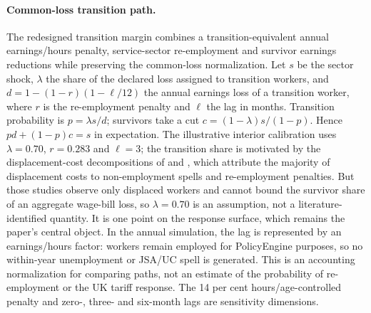 \paragraph{Common-loss transition path.} The redesigned transition margin
combines a transition-equivalent annual earnings/hours penalty, service-sector
re-employment and survivor earnings reductions while preserving the common-loss
normalization. Let $s$ be
the sector shock, $\lambda$ the share of the declared loss assigned to
transition workers, and $d=1-(1-r)(1-\ell/12)$ the annual earnings loss of a
transition worker, where $r$ is the re-employment penalty and $\ell$ the lag in
months. Transition probability is $p=\lambda s/d$; survivors take a cut
$c=(1-\lambda)s/(1-p)$. Hence $pd+(1-p)c=s$ in expectation. The illustrative
interior calibration uses $\lambda=0.70$, $r=0.283$ and $\ell=3$; the
transition share is motivated by the displacement-cost decompositions of
\citet{rud2022} and \citet{dixcarneiro2014}, which attribute the majority of
displacement costs to non-employment spells and re-employment penalties.
But those studies observe only displaced workers and cannot bound the
survivor share of an aggregate wage-bill loss, so $\lambda=0.70$ is an
assumption, not a literature-identified quantity. It is
one point on the response surface, which remains the paper's central
object. In the annual
simulation, the lag is represented by an earnings/hours factor: workers remain
employed for PolicyEngine purposes, so no within-year unemployment or JSA/UC
spell is generated. This is an accounting normalization for comparing paths,
not an estimate of the probability of re-employment or the UK tariff response.
The 14 per cent hours/age-controlled
penalty and zero-, three- and six-month lags are sensitivity dimensions.

